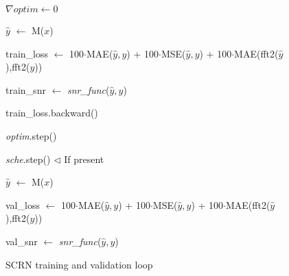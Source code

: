 \begin{figure}[ht]
	\centering
	\begin{minipage}{.95\linewidth}
		\begin{algorithm}[H]
			\caption{SCRN training and validation loop} \label{alg:SCRN}
			
			{
				{	
					{$\nabla\textit{optim} \leftarrow 0$}
					
					{$\hat{y}$ $\leftarrow$ {M($x$)}}
					
					{train\_loss $\leftarrow$ 100$\cdot$MAE($\hat{y},y$) + 100$\cdot$MSE($\hat{y},y$) + 100$\cdot$MAE(fft2($\hat{y}$),fft2($y$))}
					
					{train\_snr $\leftarrow$ \textit{snr\_func}($\hat{y},y$)}
					
					{train\_loss.backward()}
					
					{\textit{optim}.step()}
					
				}
				{\textit{sche}.step()  $\triangleleft$ If present}
				
				{	
					{$\hat{y}$ $\leftarrow$ {M($x$)}}
					
					{val\_loss $\leftarrow$ 100$\cdot$MAE($\hat{y},y$) + 100$\cdot$MSE($\hat{y},y$) + 100$\cdot$MAE(fft2($\hat{y}$),fft2($y$))}
					
					{val\_snr $\leftarrow$ \textit{snr\_func}($\hat{y},y$)}
				}
			}
		\end{algorithm}
	\end{minipage}
\end{figure}


